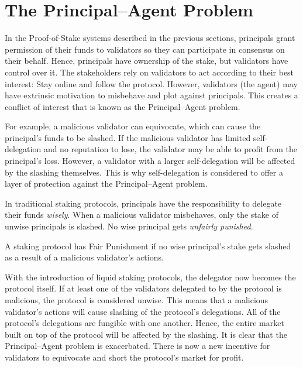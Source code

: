 \section{The Principal--Agent Problem}
In the Proof-of-Stake systems described in the previous sections,
principals grant permission of their funds to validators so they can
participate in consensus on their behalf.
Hence, principals have ownership of the stake, but
validators have control over it.
The stakeholders rely on validators to act according to their
best interest: Stay online and follow the protocol.
However, validators (the agent) may have extrinsic motivation to
misbehave and plot against principals. This creates
a conflict of interest that is known as the Principal--Agent problem.

For example, a malicious validator can equivocate, which can cause
the principal's funds to be slashed. If the malicious validator has
limited self-delegation and no reputation to lose, the validator
may be able to profit from the principal's loss. However, a validator
with a larger self-delegation will be affected by the slashing themselves.
This is why self-delegation is considered to offer a layer of protection
against the Principal--Agent problem.

In traditional staking protocols, principals have the responsibility to
delegate their funds \emph{wisely}.
When a malicious validator misbehaves, only the stake of unwise principals is
slashed. No wise principal gets \emph{unfairly punished}.

\begin{definition}
    A staking protocol has Fair Punishment if no wise principal's
    stake gets slashed as a result of a malicious validator's actions.
\end{definition}

With the introduction of liquid staking protocols, the delegator
now becomes the protocol itself. If at least one of the validators
delegated to by the protocol is malicious, the protocol is
considered unwise. This means that a malicious validator's actions
will cause slashing of the protocol's delegations.
All of the protocol's delegations are fungible with one another.
Hence, the entire market built on top of the protocol will be affected by
the slashing. It is clear that the Principal--Agent problem is exacerbated.
There is now a new incentive for validators to equivocate and short the
protocol's market for profit.

